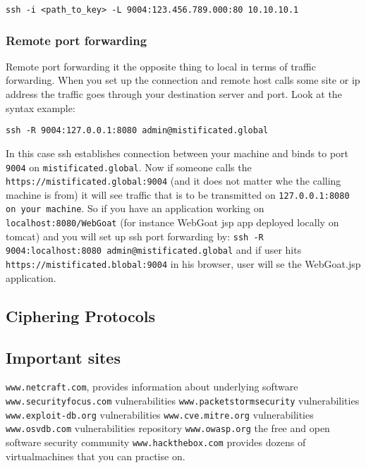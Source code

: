 \documentclass{article}[12pt]
\newcommand{\q}[1]{\texttt{#1}}
\begin{document}
\q{ssh -i <path\_to\_key> -L 9004:123.456.789.000:80 10.10.10.1}

\subsubsection{Remote port forwarding}

Remote port forwarding it the opposite thing to local in terms of traffic forwarding.
When you set up the connection and remote host calls some site or ip address the traffic goes through your destination server and port.
Look at the syntax example: \newline\newline


\q{ssh -R 9004:127.0.0.1:8080 admin@mistificated.global}\newline\newline

In this case ssh establishes connection between your machine and binds to port \q{9004} on \q{mistificated.global}.
Now if someone calls the \q{https://mistificated.global:9004} (and it does not matter whe the calling machine is from) it will see traffic that is to be transmitted on \q{127.0.0.1:8080 on your machine}.
So if you have an application working on \q{localhost:8080/WebGoat} (for instance WebGoat jsp app deployed locally on tomcat) and you will set up ssh port forwarding by: \newline
\q{ssh -R 9004:localhost:8080 admin@mistificated.global} \newline
and if user hits \q{https://mistificated.blobal:9004} in his browser, user will se the WebGoat.jsp application.

\subsection{Ciphering Protocols}

\subsection{Important sites}
\texttt{www.netcraft.com}, provides information about underlying software
\texttt{www.securityfocus.com} vulnerabilities
\texttt{www.packetstormsecurity} vulnerabilities
\texttt{www.exploit-db.org} vulnerabilities
\texttt{www.cve.mitre.org} vulnerabilities
\texttt{www.osvdb.com} vulnerabilities repository
\texttt{www.owasp.org} the free and open software security community
\texttt{www.hackthebox.com} provides dozens of virtualmachines that you can practise on.
\texttt{}
\texttt{}
\texttt{}
\end{document}
